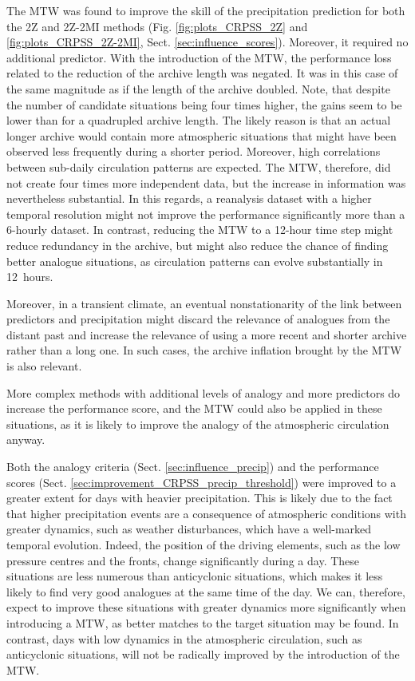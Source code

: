 \documentclass[hess, manuscript]{copernicus}
\begin{document}
	The MTW was found to improve the skill of the precipitation prediction for both the 2Z and 2Z-2MI methods (Fig. \ref{fig:plots_CRPSS_2Z} and \ref{fig:plots_CRPSS_2Z-2MI}, Sect. \ref{sec:influence_scores}). Moreover, it required no additional predictor. With the introduction of the MTW, the performance loss related to the reduction of the archive length was negated. It was in this case of the same magnitude as if the length of the archive doubled. Note, that despite the number of candidate situations being four times higher, the gains seem to be lower than for a quadrupled archive length. The likely reason is that an actual longer archive would contain more atmospheric situations that might have been observed less frequently during a shorter period. Moreover, high correlations between sub-daily circulation patterns are expected. The MTW, therefore, did not create four times more independent data, but the increase in information was nevertheless substantial. In this regards, a reanalysis dataset with a higher temporal resolution might not improve the performance significantly more than a 6-hourly dataset. In contrast, reducing the MTW to a 12-hour time step might reduce redundancy in the archive, but might also reduce the chance of finding better analogue situations, as circulation patterns can evolve substantially in 12~hours.
	
	Moreover, in a transient climate, an eventual nonstationarity of the link between predictors and precipitation might discard the relevance of analogues from the distant past and increase the relevance of using a more recent and shorter archive rather than a long one. In such cases, the archive inflation brought by the MTW is also relevant.
	
	More complex methods with additional levels of analogy and more predictors do increase the performance score, and the MTW could also be applied in these situations, as it is likely to improve the analogy of the atmospheric circulation anyway. 
	
	Both the analogy criteria (Sect. \ref{sec:influence_precip}) and the performance scores (Sect. \ref{sec:improvement_CRPSS_precip_threshold}) were improved to a greater extent for days with heavier precipitation. This is likely due to the fact that higher precipitation events are a consequence of atmospheric conditions with greater dynamics, such as weather disturbances, which have a well-marked temporal evolution. Indeed, the position of the driving elements, such as the low pressure centres and the fronts, change significantly during a day. These situations are less numerous than anticyclonic situations, which makes it less likely to find very good analogues at the same time of the day. We can, therefore, expect to improve these situations with greater dynamics more significantly when introducing a MTW, as better matches to the target situation may be found. In contrast, days with low dynamics in the atmospheric circulation, such as anticyclonic situations, will not be radically improved by the introduction of the MTW.
	
\end{document}
